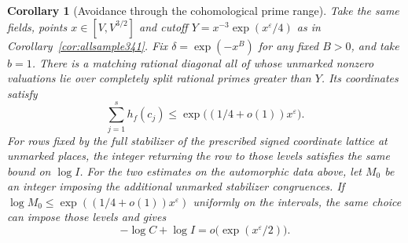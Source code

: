 \documentclass[a4paper,11pt]{article}
\newtheorem{corollary}[proposition]{Corollary}
\theoremstyle{definition}
\theoremstyle{remark}
\numberwithin{equation}{section}
\begin{document}
\begin{corollary}[Avoidance through the cohomological prime range]\leavevmode\label{cor:avoidrange343}
Take the same fields, points $x\in[V,V^{3/2}]$ and cutoff
$Y=x^{-3}\exp(x^\varepsilon/4)$ as in
Corollary~\ref{cor:allsample341}. Fix $\delta=\exp(-x^B)$ for
any fixed $B>0$, and take $b=1$. There is a matching rational
diagonal all of whose unmarked nonzero valuations lie over completely
split rational primes greater than $Y$. Its coordinates satisfy
\[
              \sum_{j=1}^s h_f(c_j)
                     \le \exp\bigl((1/4+o(1))x^\varepsilon\bigr).
\]
For rows fixed by the full stabilizer of the prescribed signed
coordinate lattice at unmarked places, the integer returning the
row to those levels satisfies the same bound on $\log I$.
For the two estimates on the automorphic data above, let $M_0$ be
an integer imposing the additional unmarked stabilizer congruences.
If $\log M_0\le\exp((1/4+o(1))x^\varepsilon)$ uniformly on the
intervals, the same choice can impose those levels and gives
\[
           -\log C+\log I=o\bigl(\exp(x^\varepsilon/2)\bigr).
\]
\end{corollary}
\end{document}
